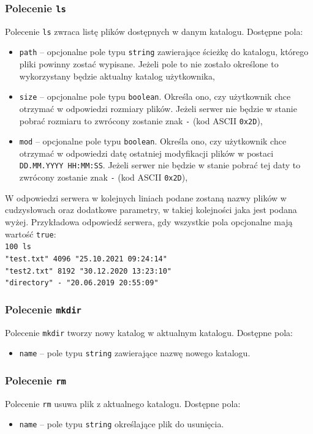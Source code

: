 \documentclass[10pt,a4paper]{article}
\begin{document}
\subsubsection{Polecenie \texttt{ls}}
Polecenie \texttt{ls} zwraca listę plików dostępnych w danym katalogu. Dostępne pola:
\begin{itemize}
    \item \texttt{path} -- opcjonalne pole typu \texttt{string} zawierające ścieżkę do katalogu, którego pliki powinny zostać wypisane. Jeżeli pole to nie zostało określone to wykorzystany będzie aktualny katalog użytkownika,
    \item \texttt{size} -- opcjonalne pole typu \texttt{boolean}. Określa ono, czy użytkownik chce otrzymać w odpowiedzi rozmiary plików. Jeżeli serwer nie będzie w stanie pobrać rozmiaru to zwrócony zostanie znak \texttt{-} (kod ASCII \texttt{0x2D}),
    \item \texttt{mod} -- opcjonalne pole typu \texttt{boolean}. Określa ono, czy użytkownik chce otrzymać w odpowiedzi datę ostatniej modyfikacji plików w postaci \texttt{DD.MM.YYYY HH:MM:SS}. Jeżeli serwer nie będzie w stanie pobrać tej daty to zwrócony zostanie znak \texttt{-} (kod ASCII \texttt{0x2D}),
\end{itemize}
W odpowiedzi serwera w kolejnych liniach podane zostaną nazwy plików w cudzysłowach oraz dodatkowe parametry, w takiej kolejności jaka jest podana wyżej. Przykładowa odpowiedź serwera, gdy wszystkie pola opcjonalne mają wartość \texttt{true}:\\
\texttt{100 ls}\\
\texttt{"test.txt"\ 4096 "25.10.2021 09:24:14"} \\
\texttt{"test2.txt"\ 8192 "30.12.2020 13:23:10"} \\
\texttt{"directory"\ - "20.06.2019 20:55:09"}

\subsubsection{Polecenie \texttt{mkdir}}
Polecenie \texttt{mkdir} tworzy nowy katalog w aktualnym katalogu. Dostępne pola:
\begin{itemize}
    \item \texttt{name} -- pole typu \texttt{string} zawierające nazwę nowego katalogu.
\end{itemize}

\subsubsection{Polecenie \texttt{rm}}
Polecenie \texttt{rm} usuwa plik z aktualnego katalogu. Dostępne pola:
\begin{itemize}
    \item \texttt{name} -- pole typu \texttt{string} określające plik do usunięcia.
\end{itemize}
\end{document}
